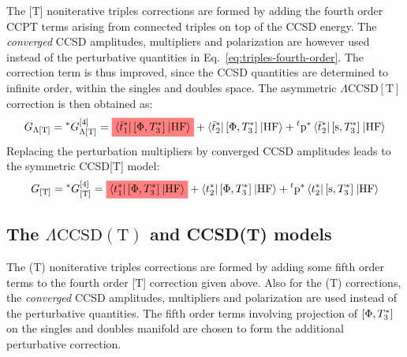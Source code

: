 
The [T] noniterative triples corrections are formed by adding the fourth
order \acs{CC}\acs{PT} terms arising from connected triples on top of
the \acs{CCSD} energy. The \emph{converged} \acs{CCSD} amplitudes,
multipliers and polarization are however used instead of the
perturbative quantities in Eq.~\eqref{eq:triples-fourth-order}.
The correction term is thus improved, since the \acs{CCSD} quantities
are determined to infinite order, within the singles and doubles space.
The asymmetric $\Lambda\text{CCSD}[\text{T}]$ correction is then
obtained as:
\begin{equation}\label{eq:4-lambda-bracket-t}
  G_{\Lambda[\text{T}]} =
  {}^*G_{\Lambda[\text{T}]}^{[4]} =
  \highlight{red}{\braket{\tbar{1}^{*} | \commutator{\Phi}{T_3^{*}} | \mathrm{HF}}}
  + \braket{\tbar{2}^{*}| \commutator{\Phi}{T_3^{*}} | \mathrm{HF}}
  + {}^t\p^{*}\braket{\tbar{2}^{*} | \commutator{\s}{T_3^{*}} | \mathrm{HF}}
\end{equation}
Replacing the perturbation multipliers by converged \acs{CCSD}
amplitudes leads to the symmetric CCSD[T] model:
\begin{equation}\label{eq:4-bracket-t}
  G_{[\text{T}]} =
  {}^*G_{[\text{T}]}^{[4]} =
  \highlight{red}{\braket{\tamp{1}^{*} | \commutator{\Phi}{T_3^{*}} | \mathrm{HF}}}
  + \braket{\tamp{2}^{*}| \commutator{\Phi}{T_3^{*}} | \mathrm{HF}}
  + {}^t\p^{*}\braket{\tamp{2}^{*} | \commutator{\s}{T_3^{*}} | \mathrm{HF}}
\end{equation}

\subsection{The
\texorpdfstring{$\Lambda\text{CCSD}(\text{T})$}{CCSD(aT)} and CCSD(T) models}


The (T) noniterative triples corrections are formed by adding some fifth
order terms to the fourth order [T] correction given above.
Also for the (T) corrections, the \emph{converged} \acs{CCSD} amplitudes, multipliers and polarization
are used instead of the perturbative quantities.
The fifth order terms involving projection of
$\left[ \Phi, T_3^{*} \right]^{}$ on the singles and doubles manifold are
chosen to form the additional perturbative correction.

